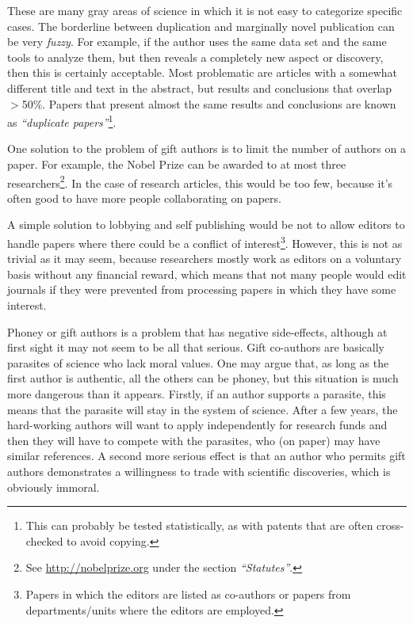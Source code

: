 \documentclass[graybox,envcountchap,sectrefs,UStrade]{svmono}
\begin{document}
These are  many gray areas of science in which it is not easy to categorize specific cases. The borderline between duplication and marginally novel publication can be very \emph{fuzzy}. For example, if the author uses the same data set and the same tools to analyze them, but then reveals a completely new aspect or discovery, then this is certainly acceptable. Most problematic are articles with a somewhat different title and text in the abstract, but results and conclusions that overlap $>$50\%. Papers that present almost the same results and conclusions are known as \emph{``duplicate papers''}\footnote{This can probably be tested statistically, as with patents that are often cross-checked to avoid copying.}.\par

One solution to the problem of gift authors is to limit the number of authors on a paper. For example, the Nobel Prize can be awarded to at most three researchers\footnote{See \url{http://nobelprize.org} under the section \emph{``Statutes''}.}. In the case of research articles, this would be too few, because it's often good to have more people collaborating on papers.  \par

A simple solution to lobbying and self publishing would be not to allow editors to handle papers where there could be a conflict of interest\footnote{Papers in which the editors are listed as co-authors or papers from departments/units where the editors are employed.}. However, this is not as trivial as it may seem, because researchers mostly work as editors on a voluntary basis without any financial reward, which means that not many people would edit journals if they were prevented from processing papers in which they have some interest.\par

Phoney or gift authors is a problem that has negative side-effects, although at first sight it may not seem to be all that serious. Gift co-authors are basically parasites of science who lack moral values. One may argue that, as long as the first author is authentic, all the others can be phoney, but this situation is much more dangerous than it appears. Firstly, if an author supports a parasite, this means that the parasite will stay in the system of science. After a few years, the hard-working authors will want to apply independently for research funds and then they will have to compete with the parasites, who (on paper) may have similar references. A second more serious effect is that an author who permits gift authors demonstrates a willingness to trade with scientific discoveries, which is obviously immoral. \par
\end{document}
